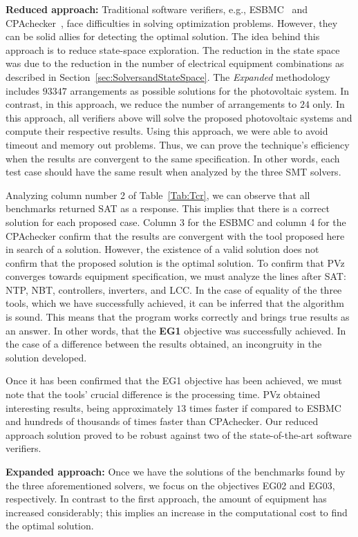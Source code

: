 \documentclass[10pt,journal,compsoc]{IEEEtran}
\begin{document}
\textbf{Reduced approach:} Traditional software verifiers, e.g., ESBMC~\cite{esbmc2018} and CPAchecker~\cite{Beyer2011}, face difficulties in solving optimization problems. However, they can be solid allies for detecting the optimal solution. The idea behind this approach is to reduce state-space exploration. The reduction in the state space was due to the reduction in the number of electrical equipment combinations as described in Section~\ref{sec:SolversandStateSpace}. The \textit{Expanded} methodology includes $93347$ arrangements as possible solutions for the photovoltaic system.
In contrast, in this approach, we reduce the number of arrangements to $24$ only. In this approach, all verifiers above will solve the proposed photovoltaic systems and compute their respective results. Using this approach, we were able to avoid timeout and memory out problems. Thus, we can prove the technique's efficiency when the results are convergent to the same specification. In other words, each test case should have the same result when analyzed by the three SMT solvers.

Analyzing column number 2 of Table~\ref{Tab:Tcr}, we can observe that all benchmarks returned SAT as a response. This implies that there is a correct solution for each proposed case. Column 3 for the ESBMC and column 4 for the CPAchecker confirm that the results are convergent with the tool proposed here in search of a solution. However, the existence of a valid solution does not confirm that the proposed solution is the optimal solution. To confirm that PVz converges towards equipment specification, we must analyze the lines after SAT: NTP, NBT, controllers, inverters, and LCC. In the case of equality of the three tools, which we have successfully achieved, it can be inferred that the algorithm is sound. This means that the program works correctly and brings true results as an answer. In other words, that the \textbf{EG1} objective was successfully achieved. In the case of a difference between the results obtained, an incongruity in the solution developed.

Once it has been confirmed that the EG1 objective has been achieved, we must note that the tools' crucial difference is the processing time. PVz obtained interesting results, being approximately $13$ times faster if compared to ESBMC and hundreds of thousands of times faster than CPAchecker. Our reduced approach solution proved to be robust against two of the state-of-the-art software verifiers.

\textbf{Expanded approach:} Once we have the solutions of the benchmarks found by the three aforementioned solvers, we focus on the objectives EG02 and EG03, respectively. In contrast to the first approach, the amount of equipment has increased considerably; this implies an increase in the computational cost to find the optimal solution.
\end{document}
